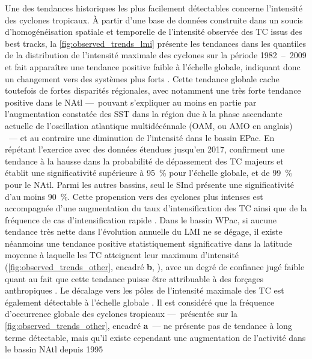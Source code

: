 \documentclass[../main.tex]{subfiles}
\begin{document}
Une des tendances historiques les plus facilement détectables concerne l'intensité des cyclones tropicaux. À partir d'une base de données construite dans un
soucis d'homogénéisation spatiale et temporelle de l'intensité observée des TC issus des best tracks, la \cref{fig:observed_trends_lmi} présente les tendances
dans les quantiles de la distribution de l'intensité maximale des cyclones sur la période \num{1982}~--~\num{2009} et fait apparaître une tendance positive
faible à l'échelle globale, indiquant donc un changement vers des systèmes plus forts \parencite{kossin_trend_2013}. Cette tendance globale cache toutefois de
fortes disparités régionales, avec notamment une très forte tendance positive dans le NAtl ---~pouvant s'expliquer au moins en partie par l'augmentation
constatée des SST dans la région due à la phase ascendante actuelle de l'oscillation atlantique multidécénnale (OAM, ou AMO en anglais)
\parencite{ting_forced_2009}~--- et au contraire une diminution de l'intensité dans le bassin EPac. En répétant l'exercice avec des données étendues jusqu'en
\num{2017}, \cite{kossin_global_2020} confirment une tendance à la hausse dans la probabilité de dépassement des TC majeurs et établit une significativité
supérieure à \SI{95}{\percent} pour l'échelle globale, et de \SI{99}{\percent} pour le NAtl. Parmi les autres bassins, seul le SInd présente une significativité
d'au moins \SI{90}{\percent}. Cette propension vers des cyclones plus intenses est accompagnée d'une augmentation du taux d'intensification des TC ainsi que de
la fréquence de cas d'intensification rapide \parencite{balaguru_increasing_2018,kishtawal_tropical_2012}. Dans le bassin WPac, si aucune tendance très nette
dans l'évolution annuelle du LMI ne se dégage, il existe néanmoins une tendance positive statistiquement significative dans la latitude moyenne à laquelle les
TC atteignent leur maximum d'intensité (\cref{fig:observed_trends_other}, encadré \textbf{b}, \hbox{\cite{kossin_comment_2018}}), avec un degré de confiance
jugé faible quant au  fait que cette tendance puisse être attribuable à des forçages anthropiques \parencite{knutson_tropical_2019}. Le décalage vers les pôles
de l'intensité maximale des TC est également détectable à l'échelle globale \parencite{kossin_poleward_2014}. Il est considéré que la fréquence d'occurrence
globale des cyclones tropicaux ---~présentée sur la \cref{fig:observed_trends_other}, encadré \textbf{a}~--- ne présente pas de tendance à long terme
détectable, mais qu'il existe cependant une augmentation de l'activité dans le bassin NAtl depuis \num{1995}
\end{document}
